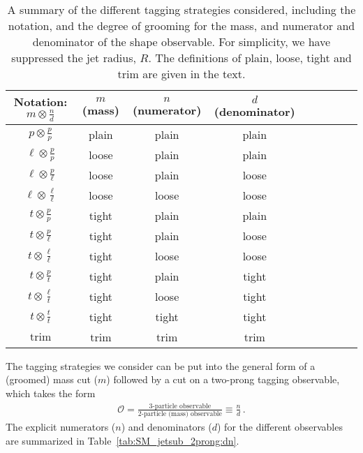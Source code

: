 \begin{table}[t!]
\begin{center}
\begin{tabular}{| c | c | c |c |c|c|c |c|c | }
  \hline                       
  Notation: $m \otimes \frac{n}{d}$ & $m$ (mass) & $n$ (numerator) & $d$ (denominator)\\
  \hline
  $p \otimes \frac{p}{p}$ & plain  &  plain & plain \\
  $\ell \otimes \frac{p}{p}$ & loose  &  plain & plain \\
  $\ell \otimes \frac{p}{\ell}$ & loose  &  plain & loose \\
  $\ell \otimes \frac{\ell}{\ell}$ & loose  &  loose & loose \\
  $t \otimes \frac{p}{p}$ & tight  &  plain & plain \\
  $t \otimes \frac{p}{\ell}$ & tight  &  plain & loose \\
  $t \otimes \frac{\ell}{\ell}$ & tight  &  loose & loose \\
  $t \otimes \frac{p}{t}$ & tight  &  plain & tight \\
  $t \otimes \frac{\ell}{t}$ & tight  &  loose & tight \\
  $t \otimes \frac{t}{t}$ & tight  &  tight & tight \\
  \hline
  $\text{trim}$ & trim &  trim & trim \\
  \hline  
\end{tabular}
\end{center}
\caption{ A summary of the different tagging strategies considered,
  including the notation, and the degree of grooming for the mass, and
  numerator and denominator of the shape observable. For simplicity,
  we have suppressed the jet radius, $R$. The definitions of plain,
  loose, tight and trim are given in the text.}
\label{tab:SM_jetsub_2prong:tag_summary}
\end{table}

The tagging strategies we consider can be put into the general form of a (groomed) mass cut ($m$) followed by a cut on a two-prong tagging observable, which takes the form
%
\begin{align}
\mathcal{O}=\frac{\text{3-particle observable}}{\text{2-particle (mass) observable}} \equiv \frac{n}{d}\,.
\end{align}
%
The explicit numerators ($n$) and denominators ($d$) for the different observables are summarized in Table~\ref{tab:SM_jetsub_2prong:dn}.


